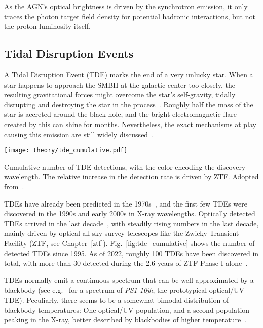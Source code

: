 As the AGN's optical brightness is driven by the synchrotron emission, it only traces the photon target field density for potential hadronic interactions, but not the proton luminosity itself.

\subsection{Tidal Disruption Events}

A Tidal Disruption Event (TDE) marks the end of a very unlucky star. When a star happens to approach the SMBH at the galactic center too closely, the resulting gravitational forces might overcome the star's self-gravity, tidally disrupting and destroying the star in the process~. Roughly half the mass of the star is accreted around the black hole, and the bright electromagnetic flare created by this can shine for months. Nevertheless, the exact mechanisms at play causing this emission are still widely discussed~.

\begin{marginfigure}
  \texttt{[image: theory/tde\_cumulative.pdf]}
  \caption[TDE detections]{Cumulative number of TDE detections, with the color encoding the discovery wavelength. The relative increase in the detection rate is driven by ZTF\@. Adopted from~\cite{Gezari2021}.}
\end{marginfigure}

TDEs have already been predicted in the 1970s~, and the first few TDEs were discovered in the 1990s and early 2000s in X-ray wavelengths. Optically detected TDEs arrived in the last decade~, with steadily rising numbers in the last decade, mainly driven by optical all-sky survey telescopes like the Zwicky Transient Facility (ZTF, see Chapter~\ref{ztf}). Fig.~\ref{fig:tde_cumulative} shows the number of detected TDEs since 1995. As of 2022, roughly 100 TDEs have been discovered in total, with more than 30 detected during the 2.6 years of ZTF Phase I alone~.

TDEs normally emit a continuous spectrum that can be well-approximated by a blackbody (see e.g.~ for a spectrum of \textit{PS1-10jh}, the prototypical optical/UV TDE). Peculiarly, there seems to be a somewhat bimodal distribution of blackbody temperatures: One optical/UV population, and a second population peaking in the X-ray, better described by blackbodies of higher temperature~\cite{Gezari2021}.

